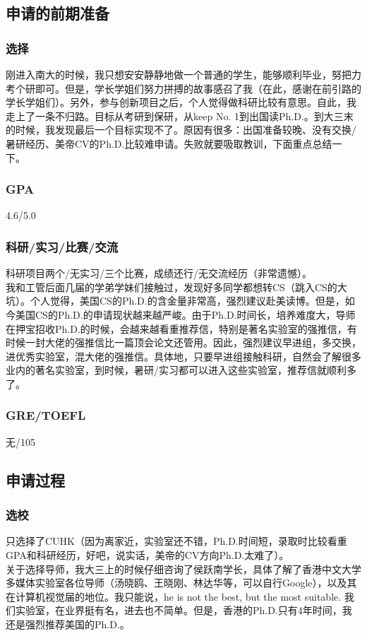 \documentclass[a4paper,UTF8]{book}
\begin{document}
    \subsection*{申请的前期准备}
        \subsubsection*{选择}
        刚进入南大的时候，我只想安安静静地做一个普通的学生，能够顺利毕业，努把力考个研即可。但是，学长学姐们努力拼搏的故事感召了我（在此，感谢在前引路的学长学姐们）。另外，参与创新项目之后，个人觉得做科研比较有意思。自此，我走上了一条不归路。目标从考研到保研，从keep No. 1到出国读Ph.D.。到大三末的时候，我发现最后一个目标实现不了。原因有很多：出国准备较晚、没有交换/暑研经历、美帝CV的Ph.D.比较难申请。失败就要吸取教训，下面重点总结一下。

        \subsubsection*{GPA}
        4.6/5.0
        \subsubsection*{科研/实习/比赛/交流}
        科研项目两个/无实习/三个比赛，成绩还行/无交流经历（非常遗憾）。\\
        我和工管后面几届的学弟学妹们接触过，发现好多同学都想转CS（跳入CS的大坑）。个人觉得，美国CS的Ph.D.的含金量非常高，强烈建议赴美读博。但是，如今美国CS的Ph.D.的申请现状越来越严峻。由于Ph.D.时间长，培养难度大，导师在押宝招收Ph.D.的时候，会越来越看重推荐信，特别是著名实验室的强推信，有时候一封大佬的强推信比一篇顶会论文还管用。因此，强烈建议早进组，多交换，进优秀实验室，混大佬的强推信。具体地，只要早进组接触科研，自然会了解很多业内的著名实验室，到时候，暑研/实习都可以进入这些实验室，推荐信就顺利多了。
        \subsubsection*{GRE/TOEFL}
        无/105

    \subsection*{申请过程}
        \subsubsection*{选校}
        只选择了CUHK（因为离家近，实验室还不错，Ph.D.时间短，录取时比较看重GPA和科研经历，好吧，说实话，美帝的CV方向Ph.D.太难了）。\\
        关于选择导师，我大三上的时候仔细咨询了侯跃南学长，具体了解了香港中文大学多媒体实验室各位导师（汤晓鸥、王晓刚、林达华等，可以自行Google），以及其在计算机视觉届的地位。我只能说，he is not the best, but the most suitable. 我们实验室，在业界挺有名，进去也不简单。但是，香港的Ph.D.只有4年时间，我还是强烈推荐美国的Ph.D.。
\end{document}
